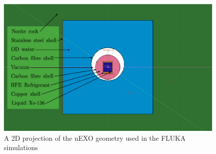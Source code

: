 \begin{figure}[h]
    \begin{center}
    \includegraphics[scale=0.3]{figures/geometry_3.png}
    \caption{A 2D projection of the nEXO geometry used in the FLUKA simulations}
    \label{fig:geometry3}
    \end{center}
\end{figure}